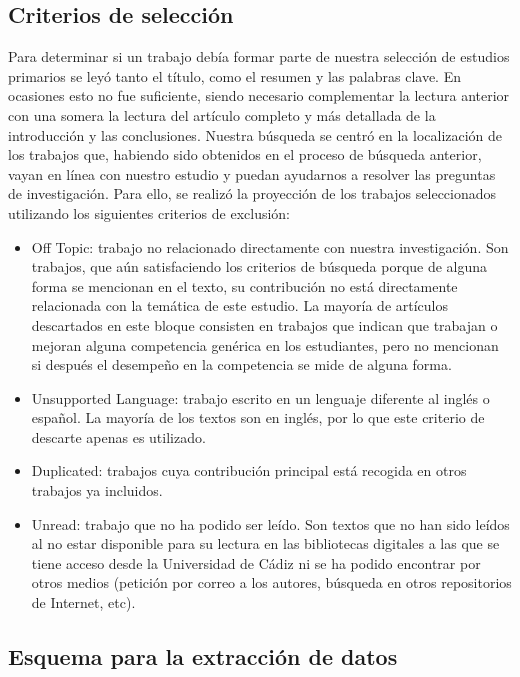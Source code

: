 \subsection{Criterios de selección}
\label{sec:CriteriosBusqueda}
Para determinar si un trabajo debía formar parte de nuestra selección de estudios primarios se leyó tanto el título, como el resumen y las palabras clave. En ocasiones esto no fue suficiente, siendo necesario complementar la lectura anterior con una somera la lectura del artículo completo y más detallada de la introducción y las conclusiones.
Nuestra búsqueda se centró en la localización de los trabajos que, habiendo sido obtenidos en el proceso de búsqueda anterior, vayan en línea con nuestro estudio y puedan ayudarnos a resolver las preguntas de investigación. Para ello, se realizó la proyección de los trabajos seleccionados utilizando los siguientes criterios de exclusión:
\begin{itemize}
\item Off Topic: trabajo no relacionado directamente con nuestra investigación. Son trabajos, que aún satisfaciendo los criterios de búsqueda porque de alguna forma se mencionan en el texto, su contribución no está directamente relacionada con la temática de este estudio. La mayoría de artículos descartados en este bloque consisten en trabajos que indican que trabajan o mejoran alguna competencia genérica en los estudiantes, pero no mencionan si después el desempeño en la competencia se mide de alguna forma.
\item Unsupported Language: trabajo escrito en un lenguaje diferente al inglés o español. La mayoría de los textos son en inglés, por lo que este criterio de descarte apenas es utilizado.
\item Duplicated: trabajos cuya contribución principal está recogida en otros trabajos ya incluidos. 
\item Unread: trabajo que no ha podido ser leído. Son textos que no han sido leídos al no estar disponible para su lectura en las bibliotecas digitales a las que se tiene acceso desde la Universidad de Cádiz ni se ha podido encontrar por otros medios (petición por correo a los autores, búsqueda en otros repositorios de Internet, etc).
\end{itemize}

\subsection{Esquema para la extracción de datos}
\label{sec:EsquemaBusqueda}

